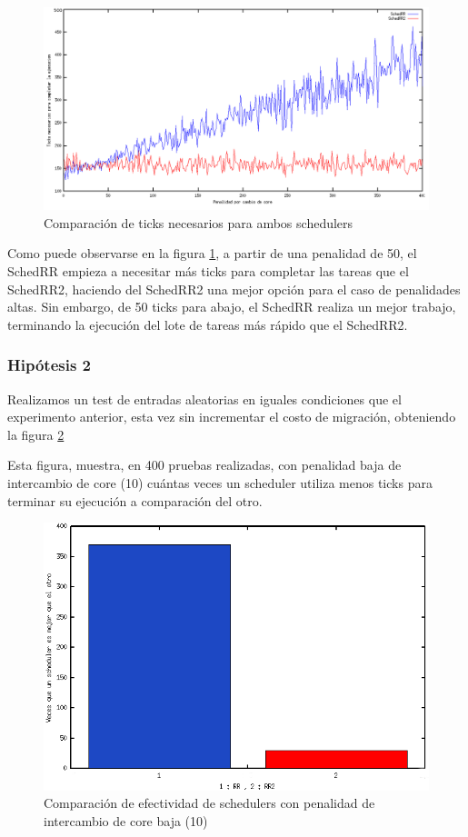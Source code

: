 \documentclass[a4paper,10pt,twoside]{article}
\begin{document}
\begin{figure}[H]
\centering
\includegraphics[width=175mm]{../ejercicio8/compTicksSched.png}
\caption{Comparación de ticks necesarios para ambos schedulers}
\label{compTicksSched}
\end{figure}

Como puede observarse en la figura \ref{compTicksSched}, a partir de una penalidad de 50, el SchedRR empieza a necesitar más ticks para completar las tareas que el SchedRR2, haciendo del SchedRR2 una mejor opción para el caso de penalidades altas. Sin embargo, de 50 ticks para abajo, el SchedRR realiza un mejor trabajo, terminando la ejecución del lote de tareas más rápido que el SchedRR2.

\subsubsection{Hipótesis 2}

Realizamos un test de entradas aleatorias en iguales condiciones que el experimento anterior, esta vez sin incrementar el costo de migración, obteniendo la figura \ref{RRvsRR2}

Esta figura, muestra, en 400 pruebas realizadas, con penalidad baja de intercambio de core (10) cuántas veces un scheduler utiliza menos ticks para terminar su ejecución a comparación del otro.

\begin{figure}[H]
\centering
\includegraphics[width=150mm]{../ejercicio8/RRvsRR2.png}
\caption{Comparación de efectividad de schedulers con penalidad de intercambio de core baja (10)}
\label{RRvsRR2}
\end{figure}
\end{document}
